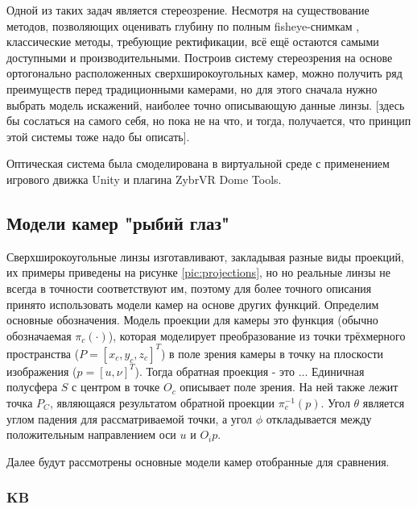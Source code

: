  Одной из таких задач является стереозрение. Несмотря на существование методов, позволяющих оценивать глубину по полным fisheye-снимкам \cite{full_fisheye_stereo}, 
классические методы, требующие ректификации, всё ещё остаются самыми доступными и производительными. Построив систему стереозрения на 
основе ортогонально расположенных сверхширокоугольных камер, можно получить ряд преимуществ перед традиционными камерами, но для этого 
сначала нужно выбрать модель искажений, наиболее точно описывающую данные линзы. [здесь бы сослаться на самого себя, но пока не на что,
и тогда, получается, что принцип этой системы тоже надо бы описать].

Оптическая система была смоделирована в виртуальной среде с применением игрового движка Unity и плагина ZybrVR Dome Tools. %

\subsection{Модели камер "рыбий глаз"}

Сверхширокоугольные линзы изготавливают, закладывая разные виды проекций, их примеры приведены на рисунке \ref{pic:projections}, но 
но реальные линзы не всегда в точности соответствуют им, поэтому для более точного описания принято использовать модели
камер на основе других функций.
Определим основные обозначения. Модель проекции для камеры это функция (обычно обозначаемая $\pi_c(\cdot )$), которая моделирует преобразование 
из точки трёхмерного пространства ($P=[x_c, y_c, z_c]^T$) в поле зрения камеры в точку на плоскости изображения ($p=[u, \nu]^T$). Тогда обратная
проекция - это ... Единичная            %
полусфера $S$ с центром в точке $O_c$ описывает поле зрения. На ней также лежит точка $P_C$, являющаяся результатом обратной проекции $\pi^{-1}_c({p})$.
Угол $\theta$ является углом падения для рассматриваемой точки, а угол $\phi$ откладывается между положительным направлением оси $u$ и $O_{i}{p}$. 

Далее будут рассмотрены основные модели камер отобранные для сравнения.

\subsubsection{KB}

